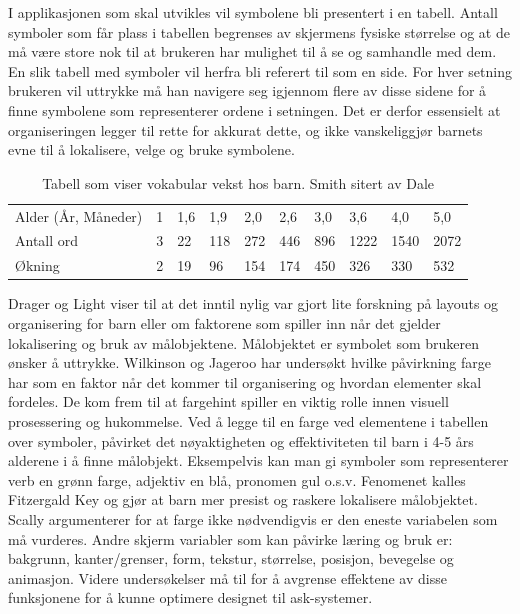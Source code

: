 \documentclass[phd,tocprelim]{cornell}
\begin{document}
I applikasjonen som skal utvikles vil symbolene bli presentert i en tabell. Antall symboler som får plass i tabellen begrenses av skjermens fysiske størrelse og at de må være store nok til at brukeren har mulighet til å se  og samhandle med dem. En slik tabell med symboler vil herfra bli referert til som en side. For hver setning brukeren vil uttrykke må han navigere seg igjennom flere av disse sidene for å finne symbolene som representerer ordene i setningen. Det er derfor essensielt at organiseringen legger til rette for akkurat dette, og ikke vanskeliggjør barnets evne til å lokalisere, velge og bruke symbolene.

\begin{table}[h]
\begin{tabular}{llllllllll}
\hline
Alder (År, Måneder) & 1 & 1,6 & 1,9 & 2,0 & 2,6 & 3,0 & 3,6  & 4,0  & 5,0  \\ 
Antall ord          & 3 & 22  & 118 & 272 & 446 & 896 & 1222 & 1540 & 2072 \\ 
Økning              & 2 & 19  & 96  & 154 & 174 & 450 & 326  & 330  & 532  \\ \hline
\end{tabular}
\caption{Tabell som viser vokabular vekst hos barn.  Smith \cite{Smith} sitert av Dale \cite{Dale} }
\label{fig:BarnVak}
\end{table}



Drager og Light \cite{aac} viser til at det inntil nylig var gjort lite forskning på layouts og organisering for barn eller om faktorene som spiller inn når det gjelder lokalisering og bruk av målobjektene. Målobjektet er symbolet som brukeren ønsker å uttrykke. Wilkinson og Jageroo \cite{Wilkinson2006} har undersøkt hvilke påvirkning farge har som en faktor når det kommer til organisering og hvordan elementer skal fordeles. De kom frem til at fargehint spiller en viktig rolle innen visuell prosessering  og hukommelse. Ved å legge til en farge ved elementene i tabellen over symboler, påvirket det nøyaktigheten og effektiviteten til barn i 4-5 års alderene i å finne målobjekt. Eksempelvis kan man gi symboler som representerer verb en grønn farge, adjektiv en blå, pronomen gul o.s.v. Fenomenet kalles Fitzergald Key og gjør at barn mer presist og raskere lokalisere målobjektet. Scally \cite{Scally} argumenterer for at farge ikke nødvendigvis er den eneste variabelen som må vurderes. Andre skjerm variabler som kan påvirke læring og bruk er: bakgrunn, kanter/grenser, form, tekstur, størrelse, posisjon, bevegelse og animasjon. Videre undersøkelser må til for å avgrense effektene av disse funksjonene for å kunne optimere designet til ask-systemer.
\end{document}

